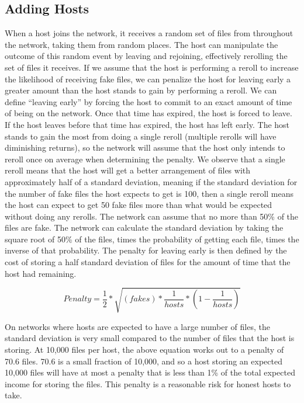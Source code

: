\documentclass[twocolumn]{article}
\begin{document}
\subsection{Adding Hosts}
When a host joins the network, it receives a random set of files from throughout the network, taking them from random places.
The host can manipulate the outcome of this random event by leaving and rejoining, effectively rerolling the set of files it receives.
If we assume that the host is performing a reroll to increase the likelihood of receiving fake files, we can penalize the host for leaving early a greater amount than the host stands to gain by performing a reroll.
We can define ``leaving early'' by forcing the host to commit to an exact amount of time of being on the network.
Once that time has expired, the host is forced to leave.
If the host leaves before that time has expired, the host has left early.
The host stands to gain the most from doing a single reroll (multiple rerolls will have diminishing returns), so the network will assume that the host only intends to reroll once on average when determining the penalty.
We observe that a single reroll means that the host will get a better arrangement of files with approximately half of a standard deviation, meaning if the standard deviation for the number of fake files the host expects to get is 100, then a single reroll means the host can expect to get 50 fake files more than what would be expected without doing any rerolls.
The network can assume that no more than 50\% of the files are fake.
The network can calculate the standard deviation by taking the square root of 50\% of the files, times the probability of getting each file, times the inverse of that probability.
The penalty for leaving early is then defined by the cost of storing a half standard deviation of files for the amount of time that the host had remaining.

\begin{equation}
Penalty = \frac{1}{2} * \sqrt{(fakes) * \frac{1}{hosts} * (1 - \frac{1}{hosts})}
\end{equation}

On networks where hosts are expected to have a large number of files, the standard deviation is very small compared to the number of files that the host is storing.
At 10,000 files per host, the above equation works out to a penalty of 70.6 files.
70.6 is a small fraction of 10,000, and so a host storing an expected 10,000 files will have at most a penalty that is less than 1\% of the total expected income for storing the files.
This penalty is a reasonable risk for honest hosts to take.
\end{document}
